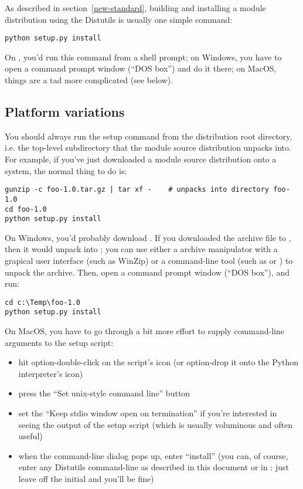 \documentclass{howto}
\begin{document}
As described in section~\ref{new-standard}, building and installing
a module distribution using the Distutils is usually one simple command:

\begin{verbatim}
python setup.py install
\end{verbatim}

On \UNIX, you'd run this command from a shell prompt; on Windows, you
have to open a command prompt window (``DOS box'') and do it there; on
MacOS, things are a tad more complicated (see below).


\subsection{Platform variations}
\label{platform-variations}

You should always run the setup command from the distribution root
directory, i.e. the top-level subdirectory that the module source
distribution unpacks into.  For example, if you've just downloaded a
module source distribution  onto a
\UNIX{} system, the normal thing to do is:

\begin{verbatim}
gunzip -c foo-1.0.tar.gz | tar xf -    # unpacks into directory foo-1.0
cd foo-1.0
python setup.py install
\end{verbatim}

On Windows, you'd probably download .  If you
downloaded the archive file to , then it
would unpack into ;
you can use either a archive manipulator with a grapical user interface
(such as WinZip) or a command-line tool (such as  or
) to unpack the archive.  Then, open a command prompt
window (``DOS box''), and run:

\begin{verbatim}
cd c:\Temp\foo-1.0
python setup.py install
\end{verbatim}

On MacOS, you have to go through a bit more effort to supply
command-line arguments to the setup script:
\begin{itemize}
\item hit option-double-click on the script's icon (or option-drop it
  onto the Python interpreter's icon)
\item press the ``Set unix-style command line'' button
\item set the ``Keep stdio window open on termination'' if you're
  interested in seeing the output of the setup script (which is usually
  voluminous and often useful)
\item when the command-line dialog pops up, enter ``install'' (you
  can, of course, enter any Distutils command-line as described in this
  document or in : just leave off the initial  and
  you'll be fine)
\end{itemize}
\end{document}

